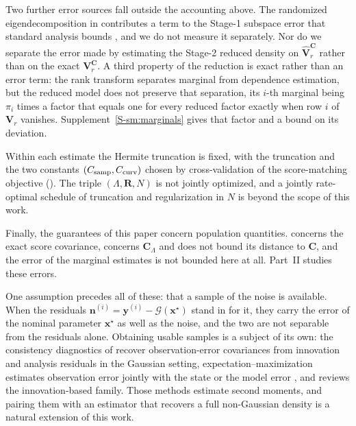 \documentclass[review,hidelinks,onefignum,onetabnum]{siamart251216}
\newcommand{\mC}{\bm{C}}
\newcommand{\mV}{\bm{V}}
\newcommand{\hmV}{\widehat{\bm{V}}}
\newcommand{\mR}{\bm{R}}
\newcommand{\vn}{\bm{n}}
\newcommand{\vx}{\bm{x}}
\newcommand{\vy}{\bm{y}}
\begin{document}
Two further error sources fall outside the accounting above. The randomized eigendecomposition in  contributes a term to the Stage-1 subspace error that standard analysis bounds \cite[Thm.~10.6 and \S 10.4]{HalkoMartinssonTropp2011}, and we do not measure it separately. Nor do we separate the error made by estimating the Stage-2 reduced density on $\hmV_r^{\mC}$ rather than on the exact $\mV_r^{\mC}$. A third property of the reduction is exact rather than an error term: the rank transform separates marginal from dependence estimation, but the reduced model does not preserve that separation, its $i$-th marginal being $\pi_i$ times a factor that equals one for every reduced factor exactly when row $i$ of $\mV_r$ vanishes. Supplement~\ref{S-sm:marginals} gives that factor and a bound on its deviation.

Within each estimate the Hermite truncation is fixed, with the truncation and the two constants $(C_{\rm samp}, C_{\rm curv})$ chosen by cross-validation of the score-matching objective (). The triple $(\Lambda, \mR, N)$ is not jointly optimized, and a jointly rate-optimal schedule of truncation and regularization in $N$ is beyond the scope of this work.

Finally, the guarantees of this paper concern population quantities.  concerns the exact score covariance,  concerns $\mC_\Lambda$ and does not bound its distance to $\mC$, and the error of the marginal estimates is not bounded here at all. Part~II \cite{CAS_partII} studies these errors.

One assumption precedes all of these: that a sample of the noise is available. When the residuals $\vn^{(i)} = \vy^{(i)} - \mathcal G(\vx^\star)$ stand in for it, they carry the error of the nominal parameter $\vx^\star$ as well as the noise, and the two are not separable from the residuals alone. Obtaining usable samples is a subject of its own: the consistency diagnostics of \cite{DesroziersBerreChapnikPoli2005} recover observation-error covariances from innovation and analysis residuals in the Gaussian setting, expectation--maximization estimates observation error jointly with the state or the model error \cite{DreanoTandeoPulido2017}, and \cite{TandeoAilliotBocquet2020} reviews the innovation-based family. Those methods estimate second moments, and pairing them with an estimator that recovers a full non-Gaussian density is a natural extension of this work.

\end{document}
